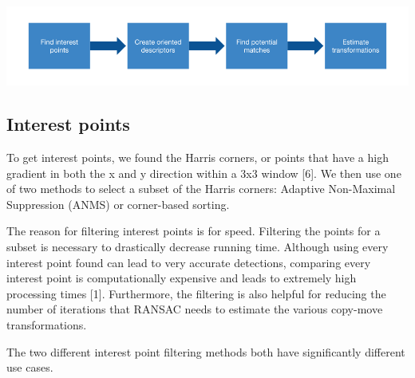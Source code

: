 \documentclass[12pt]{article}
\begin{document}
\includegraphics[width=1.0\linewidth]{./gfx/cm_pipeline.png}

\subsection*{Interest points}
To get interest points, we found the Harris corners, or points that have a high gradient in both the x and y direction within a 3x3 window [6]. We then use one of two methods to select a subset of the Harris corners: Adaptive Non-Maximal Suppression (ANMS) or corner-based sorting. 

The reason for filtering interest points is for speed. Filtering the points for a subset is necessary to drastically decrease running time. Although using every interest point found can lead to very accurate detections, comparing every interest point is computationally expensive and leads to extremely high processing times [1]. Furthermore, the filtering is also helpful for reducing the number of iterations that RANSAC needs to estimate the various copy-move transformations.

The two different interest point filtering methods both have significantly different use cases.
\end{document}
